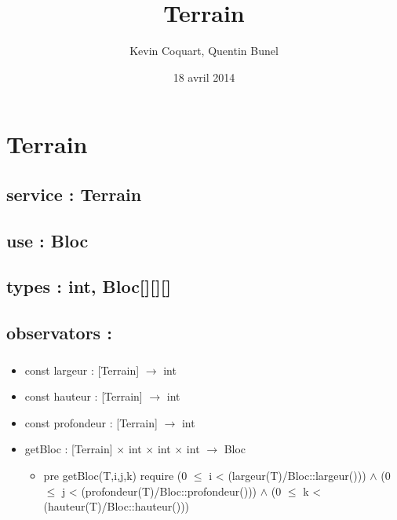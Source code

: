 \documentclass[11pt]{article}
\title{Terrain}
\author{Kevin Coquart, Quentin Bunel}
\date{18 avril 2014}
\begin{document}
\maketitle

\setcounter{tocdepth}{3}
\tableofcontents
\vspace*{1cm}
\section{Terrain}
\label{sec-1}

\subsection{service : Terrain}
\label{sec-1.1}

\subsection{use : Bloc}
\label{sec-1.2}

\subsection{types : int, Bloc[][][]}
\label{sec-1.3}



\subsection{observators :}
\label{sec-1.4}

\subsubsection{}

\begin{itemize}

\item const largeur : [Terrain] $\to$ int\\
\label{sec-1.4.1.1}


\item const hauteur : [Terrain] $\to$ int\\
\label{sec-1.4.1.2}


\item const profondeur : [Terrain] $\to$ int\\
\label{sec-1.4.1.3}


\item getBloc : [Terrain] $\times$ int $\times$ int $\times$ int $\to$ Bloc\\
\label{sec-1.4.1.4}

\begin{itemize}

\item pre getBloc(T,i,j,k) require (0 $\leqslant$ i < (largeur(T)/Bloc::largeur())) $\wedge$ (0 $\leqslant$ j < (profondeur(T)/Bloc::profondeur())) $\wedge$ (0 $\leqslant$ k < (hauteur(T)/Bloc::hauteur()))\\
\label{sec-1.4.1.4.1}


\end{itemize} %
\end{itemize} %
\end{document}
